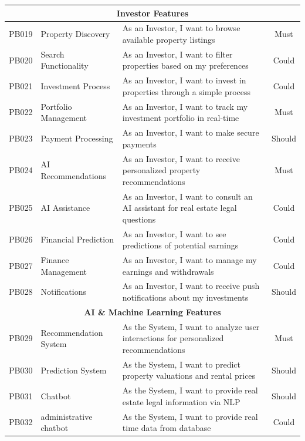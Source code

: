 \begin{longtable}{|c|l|p{8cm}|c|}
    \multicolumn{4}{|c|}{\cellcolor{primary!15}\textbf{\textcolor{primary}{Investor Features}}} \\
    \hline
    PB019 & Property Discovery & As an Investor, I want to browse available property listings & Must \\
    \hline
    PB020 & Search Functionality & As an Investor, I want to filter properties based on my preferences & Could \\
    \hline
    PB021 & Investment Process & As an Investor, I want to invest in properties through a simple process & Could \\
    \hline
    PB022 & Portfolio Management & As an Investor, I want to track my investment portfolio in real-time & Must \\
    \hline
    PB023 & Payment Processing & As an Investor, I want to make secure payments & Should \\
    \hline
    PB024 & AI Recommendations & As an Investor, I want to receive personalized property recommendations & Must \\
    \hline
    PB025 & AI Assistance & As an Investor, I want to consult an AI assistant for real estate legal questions & Could \\
    \hline
    PB026 & Financial Prediction & As an Investor, I want to see predictions of potential earnings & Could \\
    \hline
    PB027 & Finance Management & As an Investor, I want to manage my earnings and withdrawals & Could \\
    \hline
    
    PB028 & Notifications & As an Investor, I want to receive push notifications about my investments & Should \\
    \hline
    \multicolumn{4}{|c|}{\cellcolor{primary!15}\textbf{\textcolor{primary}{AI \& Machine Learning Features}}} \\
    \hline
    PB029 & Recommendation System & As the System, I want to analyze user interactions for personalized recommendations & Must \\
    \hline
    PB030 & Prediction System & As the System, I want to predict property valuations and rental prices & Should \\
    \hline
    PB031 & Chatbot & As the System, I want to provide real estate legal information via NLP & Should \\
    \hline
    PB032 & administrative chatbot & As the System, I want to provide real time data from database & Could \\
    \hline
    

\end{longtable}

